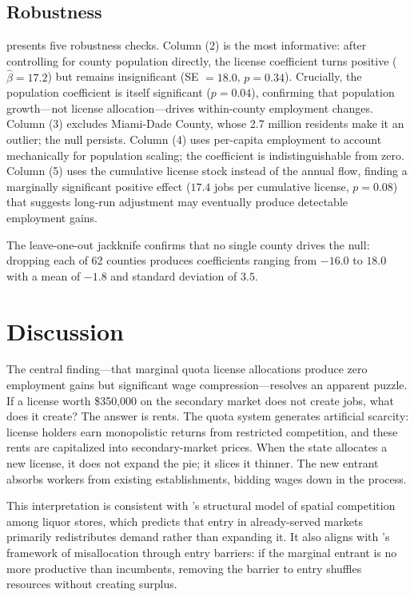 \documentclass[12pt]{article}
\begin{document}
\subsection{Robustness}



 presents five robustness checks. Column (2) is the most informative: after controlling for county population directly, the license coefficient turns positive ($\hat{\beta} = 17.2$) but remains insignificant (SE $= 18.0$, $p = 0.34$). Crucially, the population coefficient is itself significant ($p = 0.04$), confirming that population growth---not license allocation---drives within-county employment changes. Column (3) excludes Miami-Dade County, whose 2.7 million residents make it an outlier; the null persists. Column (4) uses per-capita employment to account mechanically for population scaling; the coefficient is indistinguishable from zero. Column (5) uses the cumulative license stock instead of the annual flow, finding a marginally significant positive effect ($17.4$ jobs per cumulative license, $p = 0.08$) that suggests long-run adjustment may eventually produce detectable employment gains.

The leave-one-out jackknife confirms that no single county drives the null: dropping each of 62 counties produces coefficients ranging from $-16.0$ to $18.0$ with a mean of $-1.8$ and standard deviation of $3.5$.

\section{Discussion}

The central finding---that marginal quota license allocations produce zero employment gains but significant wage compression---resolves an apparent puzzle. If a license worth \$350,000 on the secondary market does not create jobs, what does it create? The answer is rents. The quota system generates artificial scarcity: license holders earn monopolistic returns from restricted competition, and these rents are capitalized into secondary-market prices. When the state allocates a new license, it does not expand the pie; it slices it thinner. The new entrant absorbs workers from existing establishments, bidding wages down in the process.

This interpretation is consistent with \citet{seim2006empirical}'s structural model of spatial competition among liquor stores, which predicts that entry in already-served markets primarily redistributes demand rather than expanding it. It also aligns with \citet{hsieh2009misallocation}'s framework of misallocation through entry barriers: if the marginal entrant is no more productive than incumbents, removing the barrier to entry shuffles resources without creating surplus.
\end{document}

